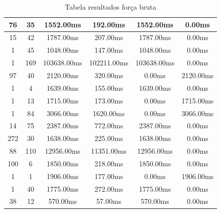 \documentclass[12pt]{article}
\begin{document}
\begin{table}[h!]
\begin{tabular}{|c|c|c|c|c|c|}
                    76 & 35 & 1552.00ms & 192.00ms & 1552.00ms & 0.00ms \\ \hline
                    15 & 42 & 1787.00ms & 207.00ms & 1787.00ms & 0.00ms \\ \hline
                    1 & 45 & 1048.00ms & 147.00ms & 1048.00ms & 0.00ms \\ \hline
                    1 & 169 & 103638.00ms & 102211.00ms & 103638.00ms & 0.00ms \\ \hline
                    97 & 40 & 2120.00ms & 320.00ms & 0.00ms & 2120.00ms \\ \hline
                    1 & 4 & 1639.00ms & 155.00ms & 1639.00ms & 0.00ms \\ \hline
                    1 & 13 & 1715.00ms & 173.00ms & 0.00ms & 1715.00ms \\ \hline
                    1 & 84 & 3066.00ms & 1620.00ms & 0.00ms & 3066.00ms \\ \hline
                    14 & 75 & 2387.00ms & 772.00ms & 2387.00ms & 0.00ms \\ \hline
                    272 & 30 & 1638.00ms & 225.00ms & 1638.00ms & 0.00ms \\ \hline
                    88 & 110 & 12956.00ms & 11351.00ms & 12956.00ms & 0.00ms \\ \hline
                    100 & 6 & 1850.00ms & 218.00ms & 1850.00ms & 0.00ms \\ \hline
                    1 & 1 & 1906.00ms & 177.00ms & 0.00ms & 1906.00ms \\ \hline
                    1 & 40 & 1775.00ms & 272.00ms & 1775.00ms & 0.00ms \\ \hline
                    38 & 12 & 570.00ms & 57.00ms & 570.00ms & 0.00ms \\ \hline
            \end{tabular}
            \caption{Tabela resultados força bruta}
            \label{Tabela: Forca Bruta}
        \end{table}
\end{document}
